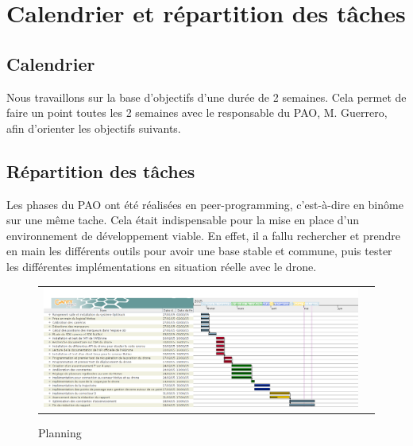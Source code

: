 \chapter{Calendrier et répartition des tâches}

\section{Calendrier}

	Nous travaillons sur la base d'objectifs d'une durée de 2 semaines. Cela permet de faire un point toutes les 2 semaines avec le responsable du PAO, M. Guerrero, afin d'orienter les objectifs suivants.

\section{Répartition des tâches}
	Les phases du PAO ont été réalisées en peer-programming, c'est-à-dire en binôme sur une même tache. Cela était indispensable pour la mise en place d'un environnement de développement viable. En effet, il a fallu rechercher et prendre en main les différents outils pour avoir une base stable et commune, puis tester les différentes implémentations en situation réelle avec le drone.

	\begin{figure}
	\hspace{-1cm}
	\begin{tabular}{|@{}l@{}l}
		\includegraphics[width=24cm,angle=90]{images/plannification.png}
	 \end{tabular}
	 \caption{Planning}
	 \end{figure}

